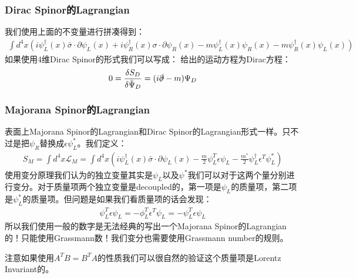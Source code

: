 \subsubsection{Dirac Spinor的Lagrangian}

我们使用上面的不变量进行拼凑得到：
\begin{align}
  \int d^4x\left(i\psi_L^\dagger(x)\bar{\sigma}\cdot\partial\psi_L(x)+i\psi_R^\dagger(x)\sigma\cdot\partial\psi_R(x)-m\psi_L^\dagger(x)\psi_R(x)-m\psi_R^\dagger(x)\psi_L(x)\right)
\end{align}
如果使用4维Dirac Spinor的形式我们可以写成：
给出的运动方程为Dirac方程：
\begin{align}
  0=\frac{\delta S_D}{\delta\bar{\Psi}_D}=(i\slashed{\partial}-m)\Psi_D
\end{align}



\subsubsection{Majorana Spinor的Lagrangian}

表面上Majorana Spinor的Lagrangian和Dirac Spinor的Lagrangian形式一样。只不过是把$ \psi_R $替换成$ \epsilon\psi_L^* $。我们定义：
\begin{align}
  S_M=\int d^4x\mathcal{L}_M=\int d^4x\left(i\psi_L^\dagger(x)\bar{\sigma}\cdot\partial\psi_L(x)-\frac{m}{2}\psi_L^T\epsilon\psi_L-\frac{m^*}{2}\psi_L^\dagger\epsilon^T\psi_L^*\right)
\end{align}
使用变分原理我们认为的独立变量其实是$ \psi_L $以及$ \psi^* $我们可以对于这两个量分别进行变分。对于质量项两个独立变量是decoupled的，第一项是$ \psi_L $的质量项，第二项是$ \psi_L^* $的质量项。但问题是如果我们看质量项的话会发现：
\begin{align}
  \psi_L^T\epsilon\psi_L = - \phi_L^T \epsilon^T \psi_L =  - \psi_L^T\epsilon\psi_L 
\end{align}
所以我们使用一般的数字是无法经典的写出一个Majorana Spinor的Lagrangian的！只能使用Grassmann数！我们变分也需要使用Grassmann number的规则。

注意如果使用$ A^T B = B^T A $的性质我们可以很自然的验证这个质量项是Lorentz Invariant的。



